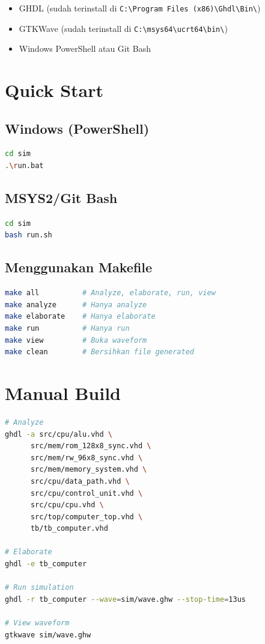 \documentclass[12pt,a4paper]{report}
\begin{document}
\begin{itemize}
  \item GHDL (sudah terinstall di \texttt{C:\textbackslash Program Files (x86)\textbackslash Ghdl\textbackslash Bin\textbackslash})
  \item GTKWave (sudah terinstall di \texttt{C:\textbackslash msys64\textbackslash ucrt64\textbackslash bin\textbackslash})
  \item Windows PowerShell atau Git Bash
\end{itemize}

\section{Quick Start}

\subsection{Windows (PowerShell)}

\begin{lstlisting}[language=bash]
cd sim
.\run.bat
\end{lstlisting}

\subsection{MSYS2/Git Bash}

\begin{lstlisting}[language=bash]
cd sim
bash run.sh
\end{lstlisting}

\subsection{Menggunakan Makefile}

\begin{lstlisting}[language=bash]
make all          # Analyze, elaborate, run, view
make analyze      # Hanya analyze
make elaborate    # Hanya elaborate
make run          # Hanya run
make view         # Buka waveform
make clean        # Bersihkan file generated
\end{lstlisting}

\section{Manual Build}

\begin{lstlisting}[language=bash]
# Analyze
ghdl -a src/cpu/alu.vhd \
      src/mem/rom_128x8_sync.vhd \
      src/mem/rw_96x8_sync.vhd \
      src/mem/memory_system.vhd \
      src/cpu/data_path.vhd \
      src/cpu/control_unit.vhd \
      src/cpu/cpu.vhd \
      src/top/computer_top.vhd \
      tb/tb_computer.vhd

# Elaborate
ghdl -e tb_computer

# Run simulation
ghdl -r tb_computer --wave=sim/wave.ghw --stop-time=13us

# View waveform
gtkwave sim/wave.ghw
\end{lstlisting}
\end{document}
